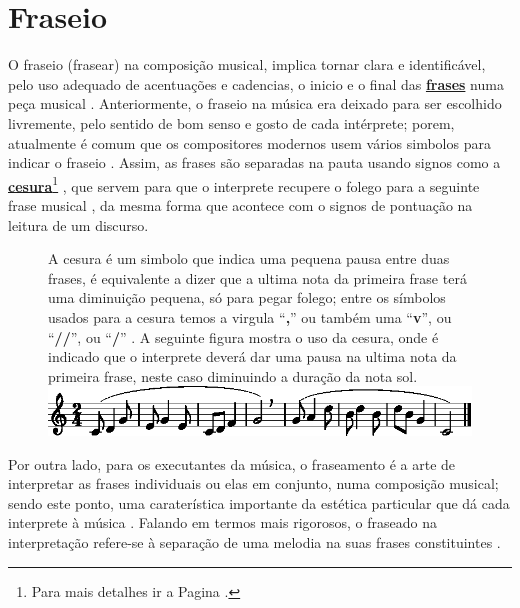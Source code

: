 \section{Fraseio}
\label{sec:fraseio}

O fraseio (frasear) na composição musical, implica  tornar clara e identificável, 
pelo uso adequado de acentuações e cadencias, 
o inicio e o final das \hyperref[sec:Frase]{\textbf{frases}} numa peça musical \cite[pp. 336]{medteoria} \cite[pp. 19]{holst1998abc}.
Anteriormente, 
o fraseio na música era deixado para ser escolhido livremente, pelo sentido de bom senso e gosto de cada intérprete;
porem, atualmente é comum que os compositores modernos usem vários simbolos para indicar o fraseio \cite[pp. 348]{stainer2009dictionary}.
Assim, as frases são separadas na pauta usando signos como a \hyperref[fig:Cesura]{\textbf{cesura}}\footnote{Para
 mais detalhes ir a Pagina \pageref{fig:Cesura}.}  \cite[pp. 668]{apel1969harvard},
que servem para que o interprete recupere o folego 
para  a seguinte frase musical \cite[pp. 18]{holst1998abc} \cite[pp. 48]{howard1991aprendendo},
da mesma forma que acontece com o signos de pontuação na leitura de um discurso.




\begin{figure}[!h]
\begin{elaboracion}[title=Cesura]
A cesura é um simbolo que indica uma pequena pausa entre duas frases,
é equivalente a dizer que a ultima nota da primeira frase terá uma diminuição pequena, só para pegar folego;
entre os símbolos usados para a cesura temos a virgula ``\textbf{,}'' 
ou também uma ``\textbf{v}'', ou ``\textbf{//}'', ou ``\textbf{/}'' 
\cite[pp. 252]{medteoria} \cite[pp. 18]{holst1998abc}.
A seguinte figura mostra o uso da cesura, onde é indicado que o interprete deverá 
dar uma pausa na ultima nota da primeira frase, neste caso diminuindo a duração da nota sol.\\
\includegraphics[width=\textwidth]{chapters/cap-musica-topicos/cesura1-1.eps}
\end{elaboracion}
\label{fig:Cesura}
\end{figure}
 
Por outra lado, para os executantes da música, 
o fraseamento é a arte de interpretar as frases individuais ou elas em conjunto, numa composição musical;
sendo este ponto, 
uma caraterística importante da estética particular que dá cada interprete à música 
\cite[pp. 257]{medteoria} \cite[pp. 624]{latham2008diccionario}.
Falando em termos mais rigorosos, 
o fraseado na interpretação refere-se à separação de uma melodia na suas frases constituintes 
\cite[pp. 668]{apel1969harvard}.

